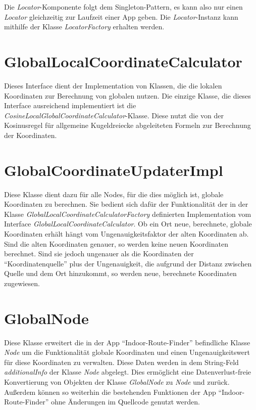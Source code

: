 Die \textit{Locator}-Komponente folgt dem Singleton-Pattern, es kann also nur einen \textit{Locator} gleichzeitig zur Laufzeit einer App geben. Die \textit{Locator}-Instanz kann mithilfe der Klasse \textit{LocatorFactory} erhalten werden.

\section{GlobalLocalCoordinateCalculator}
Dieses Interface dient der Implementation von Klassen, die die lokalen Koordinaten zur Berechnung von globalen nutzen. Die einzige Klasse, die dieses Interface ausreichend implementiert ist die \textit{CosineLocalGlobalCoordinateCalculator}-Klasse. Diese nutzt die von der Kosinusregel für allgemeine Kugeldreiecke abgeleiteten Formeln zur Berechnung der Koordinaten.

\section{GlobalCoordinateUpdaterImpl}
Diese Klasse dient dazu für alle Nodes, für die dies möglich ist, globale Koordinaten zu berechnen. Sie bedient sich dafür der Funktionalität der in der Klasse \textit{GlobalLocalCoordinateCalculatorFactory} definierten Implementation vom Interface \textit{GlobalLocalCoordinateCalculator}. Ob ein Ort neue, berechnete, globale Koordinaten erhält hängt vom Ungenauigkeitsfaktor der alten Koordinaten ab. Sind die alten Koordinaten genauer, so werden keine neuen Koordinaten berechnet. Sind sie jedoch ungenauer als die Koordinaten der \enquote{Koordinatenquelle} plus der Ungenauigkeit, die aufgrund der Distanz zwischen Quelle und dem Ort hinzukommt, so werden neue, berechnete Koordinaten zugewiesen.

\section{GlobalNode}
Diese Klasse erweitert die in der App \enquote{Indoor-Route-Finder} befindliche Klasse \textit{Node} um die Funktionalität globale Koordinaten und einen Ungenauigkeitswert für diese Koordinaten zu verwalten. Diese Daten werden in dem String-Feld \textit{additionalInfo} der Klasse \textit{Node} abgelegt. Dies ermöglicht eine Datenverlust-freie Konvertierung von Objekten der Klasse \textit{GlobalNode} zu \textit{Node} und zurück. Außerdem können so weiterhin die bestehenden Funktionen der App \enquote{Indoor-Route-Finder} ohne Änderungen im Quellcode genutzt werden.

